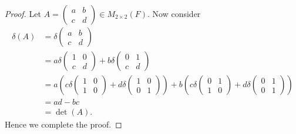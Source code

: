 \begin{Exercise}
\begin{proof}
Let $A = \begin{pmatrix}
a & b \\
c & d
\end{pmatrix}\in M_{2\times 2}(F)$. Now consider
\begin{align*}
\delta(A)
&= \delta\begin{pmatrix}
a & b \\
c & d
\end{pmatrix} \\
&= a\delta\begin{pmatrix}
1 & 0 \\
c & d
\end{pmatrix} + b\delta\begin{pmatrix}
0 & 1 \\
c & d
\end{pmatrix} \\
&= a\left(c\delta\begin{pmatrix}
1 & 0 \\
1 & 0
\end{pmatrix} + d\delta\begin{pmatrix}
1 & 0 \\
0 & 1
\end{pmatrix}\right) + b\left( c\delta\begin{pmatrix}
0 & 1 \\
1 & 0
\end{pmatrix} + d\delta\begin{pmatrix}
0 & 1 \\
0 & 1
\end{pmatrix}\right) \\
&= a d - b c \\
&= \det(A).
\end{align*}
Hence we complete the proof.
\end{proof}
\end{Exercise}